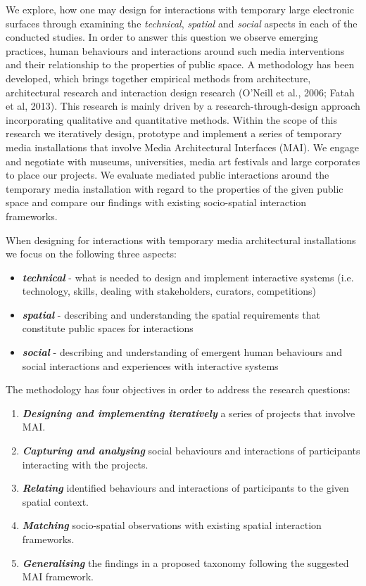 We explore, how one may design for interactions with temporary large electronic surfaces through examining the \textit{technical}, \textit{spatial }and \textit{social} aspects in each of the conducted studies. In order to answer this question we observe emerging practices, human behaviours and interactions around such media interventions and their relationship to the properties of public space. 
A methodology has been developed, which brings together empirical methods from architecture, architectural research and interaction design research (O’Neill et al., 2006; Fatah et al, 2013). 
This research is mainly driven by a research-through-design approach incorporating qualitative and quantitative methods.
Within the scope of this research we iteratively design, prototype and implement a series of temporary media installations that involve Media Architectural Interfaces (MAI).
We engage and negotiate with museums, universities, media art festivals and large corporates to place our projects.
We evaluate mediated public interactions around the temporary media installation with regard to the properties of the given public space and compare our findings with existing socio-spatial interaction frameworks.


When designing for interactions with temporary media architectural installations we focus on the following three aspects:


\begin{itemize}
\item \textit{\textbf{technical}} - what is needed to design and implement interactive systems (i.e. technology, skills, dealing with stakeholders, curators, competitions)
\item \textit{\textbf{spatial}} - describing and understanding the spatial requirements that constitute public spaces for interactions
\item \textit{\textbf{social}} - describing and understanding of emergent human behaviours and social interactions and experiences with interactive systems 
\end{itemize}


The methodology has four objectives in order to address the research questions: 
\begin{enumerate}
\setcounter{enumi}{0}
\item \textbf{\textit{Designing and implementing iteratively}} a series of projects that involve MAI.
\item \textit{\textbf{Capturing and analysing}} social behaviours and interactions of participants interacting with the projects. 
\item \textbf{\textit{Relating}} identified behaviours and interactions of participants to the given spatial context.
\item \textbf{\textit{Matching}} socio-spatial observations with existing spatial interaction frameworks.
\item \textbf{\textit{Generalising}} the findings in a proposed taxonomy following the suggested MAI framework.
\end{enumerate}

